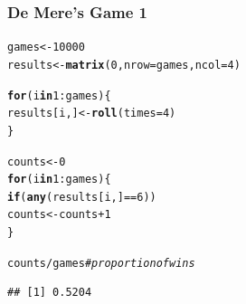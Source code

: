 \documentclass[12pt]{beamer}\usepackage[]{graphicx}\usepackage[]{color}
\makeatletter
\newcommand{\hlnum}[1]{\textcolor[rgb]{0.686,0.059,0.569}{#1}}%
\newcommand{\hlcom}[1]{\textcolor[rgb]{0.678,0.584,0.686}{\textit{#1}}}%
\newcommand{\hlopt}[1]{\textcolor[rgb]{0,0,0}{#1}}%
\newcommand{\hlstd}[1]{\textcolor[rgb]{0.345,0.345,0.345}{#1}}%
\newcommand{\hlkwa}[1]{\textcolor[rgb]{0.161,0.373,0.58}{\textbf{#1}}}%
\newcommand{\hlkwb}[1]{\textcolor[rgb]{0.69,0.353,0.396}{#1}}%
\newcommand{\hlkwc}[1]{\textcolor[rgb]{0.333,0.667,0.333}{#1}}%
\newcommand{\hlkwd}[1]{\textcolor[rgb]{0.737,0.353,0.396}{\textbf{#1}}}%
\newenvironment{kframe}{%
 \def\at@end@of@kframe{}%
 \ifinner\ifhmode%
  \def\at@end@of@kframe{\end{minipage}}%
  \begin{minipage}{\columnwidth}%
 \fi\fi%
 \def\FrameCommand##1{\hskip\@totalleftmargin \hskip-\fboxsep
 \colorbox{shadecolor}{##1}\hskip-\fboxsep
     \hskip-\linewidth \hskip-\@totalleftmargin \hskip\columnwidth}%
 \MakeFramed {\advance\hsize-\width
   \@totalleftmargin\z@ \linewidth\hsize
   \@setminipage}}%
 {\par\unskip\endMakeFramed%
 \at@end@of@kframe}
\newenvironment{knitrout}{}{} %
\makeatother
\begin{document}
\begin{frame}[fragile]
\frametitle{De Mere's Game 1}

\begin{knitrout}\footnotesize
{}\color{fgcolor}\begin{kframe}
\begin{alltt}
\hlstd{games} \hlkwb{<-} \hlnum{10000}
\hlstd{results} \hlkwb{<-} \hlkwd{matrix}\hlstd{(}\hlnum{0}\hlstd{,} \hlkwc{nrow} \hlstd{= games,} \hlkwc{ncol} \hlstd{=} \hlnum{4}\hlstd{)}

\hlkwa{for} \hlstd{(i} \hlkwa{in} \hlnum{1}\hlopt{:}\hlstd{games) \{}
  \hlstd{results[i, ]} \hlkwb{<-} \hlkwd{roll}\hlstd{(}\hlkwc{times} \hlstd{=} \hlnum{4}\hlstd{)}
\hlstd{\}}

\hlstd{counts} \hlkwb{<-} \hlnum{0}
\hlkwa{for} \hlstd{(i} \hlkwa{in} \hlnum{1}\hlopt{:}\hlstd{games) \{}
  \hlkwa{if} \hlstd{(}\hlkwd{any}\hlstd{(results[i, ]} \hlopt{==} \hlnum{6}\hlstd{))}
    \hlstd{counts} \hlkwb{<-} \hlstd{counts} \hlopt{+} \hlnum{1}
\hlstd{\}}

\hlstd{counts} \hlopt{/} \hlstd{games}  \hlcom{# proportion of wins}
\end{alltt}
\begin{verbatim}
## [1] 0.5204
\end{verbatim}
\end{kframe}
\end{knitrout}

\end{frame}

\end{document}
